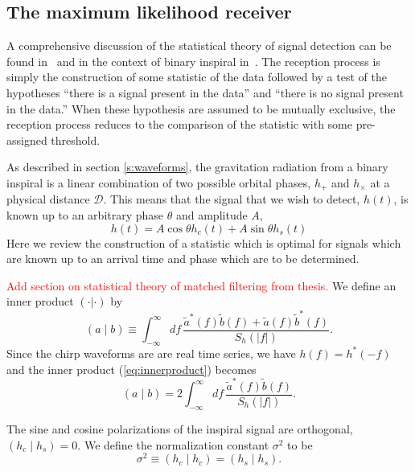 \subsection{The maximum likelihood receiver}
\label{ss:maxrec}

A comprehensive discussion of the statistical theory of signal detection can
be found in~\cite{wz} and in the context of binary inspiral
in~\cite{finn,finnchernoff}. The reception process is simply the construction
of some statistic of the data followed by a test of the hypotheses ``there is
a signal present in the data'' and ``there is no signal present in the data.''
When these hypothesis are assumed to be mutually exclusive, the reception
process reduces to the comparison of the statistic with some pre-assigned
threshold. 

As described in section \ref{s:waveforms}, the gravitation radiation from a
binary inspiral is a linear combination of two possible orbital phases,
$h_{+}$ and $h_{\times}$ at a physical distance $\mathcal{D}$. This means that
the signal that we wish to detect, $h(t)$, is known up to an arbitrary phase
$\theta$ and amplitude $A$,
\begin{equation}
h(t) = A \cos \theta h_c(t) + A \sin \theta h_s(t)
\end{equation}
Here we review the construction of a statistic which is optimal for
signals which are known up to an arrival time and phase which are to be
determined.

\textcolor{red}{Add section on statistical theory of matched filtering from
thesis.} We define an inner product $(\cdot|\cdot)$ by
\begin{equation}
\label{eq:innerproduct}
  (a\mid b) \equiv \int_{-\infty}^\infty df\,
  \frac{\tilde{a}^\ast(f)\tilde{b}(f)+\tilde{a}(f)\tilde{b}^\ast(f)}
       {S_h(|f|)}.
\end{equation}
Since the chirp waveforms are are real time series, we have $h(f) =
h^\ast(-f)$ and the inner product (\ref{eq:innerproduct}) becomes
\begin{equation}
\left(a\mid b\right) = 2 \int_{-\infty}^{\infty}df\,
\frac{\tilde{a}^\ast(f)\tilde{b}(f)}{S_h\left(\left|f\right|\right)}.
\end{equation}

The sine and cosine polarizations of the inspiral signal are orthogonal,
$\left(h_c\mid h_s\right) = 0$. We define the normalization constant
$\sigma^2$ to be
\begin{equation}
\sigma^2 \equiv \left(h_c\mid h_c\right) = \left(h_s\mid h_s\right).
\end{equation}

